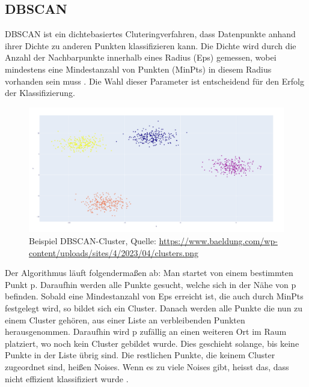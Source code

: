 \documentclass[a4paper,12pt]{article}
\begin{document}
	\subsection{DBSCAN}
	DBSCAN ist ein dichtebasiertes Cluteringverfahren, dass Datenpunkte anhand ihrer Dichte zu anderen Punkten klassifizieren kann.
	Die Dichte wird durch die Anzahl der Nachbarpunkte innerhalb eines Radius (Eps) gemessen, wobei mindestens eine Mindestanzahl von Punkten (MinPts) in diesem Radius vorhanden sein muss \cite{ester1996dbscan}. Die Wahl dieser Parameter ist entscheidend für den Erfolg der Klassifizierung.
	
	\begin{figure}[H]
		\centering
		\includegraphics[width=0.9\linewidth]{screenshot015}
		\caption{Beispiel DBSCAN-Cluster, Quelle: \url{https://www.baeldung.com/wp-content/uploads/sites/4/2023/04/clusters.png}}
		\label{fig:screenshot015}
	\end{figure}
	
	Der Algorithmus läuft folgendermaßen ab:
	Man startet von einem bestimmten Punkt p. Daraufhin werden alle Punkte gesucht, welche sich in der Nähe von p befinden. Sobald eine Mindestanzahl von Eps erreicht ist, die auch durch MinPts festgelegt wird, so bildet sich ein Cluster. Danach werden alle Punkte die nun zu einem Cluster gehören, aus einer Liste an verbleibenden Punkten herausgenommen. Daraufhin wird p zufällig an einen weiteren Ort im Raum platziert, wo noch kein Cluster gebildet wurde. Dies geschieht solange, bis keine Punkte in der Liste übrig sind. Die restlichen Punkte, die keinem Cluster zugeordnet sind, heißen Noises. Wenn es zu viele Noises gibt, heisst das, dass nicht effizient klassifiziert wurde \cite{ester1996dbscan}. 
	
\end{document}
